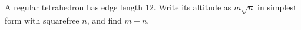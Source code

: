 A regular tetrahedron has edge length $12$. Write its altitude as $m\sqrt n$ in simplest form with squarefree $n$, and find $m+n$.
